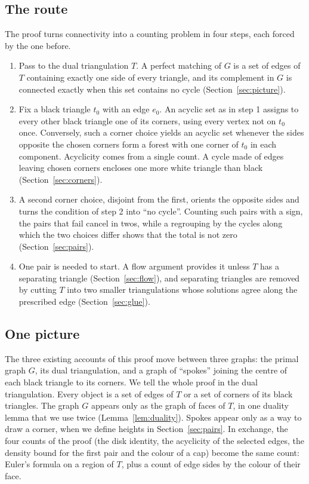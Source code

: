 \documentclass[10pt]{amsart}
\numberwithin{equation}{section}
\theoremstyle{definition}
\theoremstyle{remark}
\newcommand{\T}{T}
\begin{document}
\subsection*{The route}
The proof turns connectivity into a counting problem in four steps, each forced by the one before.
\begin{enumerate}
\item Pass to the dual triangulation $\T$.
A perfect matching of $G$ is a set of edges of $\T$ containing exactly one side of every triangle, and its complement in $G$ is connected exactly when this set contains no cycle (Section~\ref{sec:picture}).
\item Fix a black triangle $t_0$ with an edge $e_0$.
An acyclic set as in step 1 assigns to every other black triangle one of its corners, using every vertex not on $t_0$ once.
Conversely, such a corner choice yields an acyclic set whenever the sides opposite the chosen corners form a forest with one corner of $t_0$ in each component.
Acyclicity comes from a single count. A cycle made of edges leaving chosen corners encloses one more white triangle than black (Section~\ref{sec:corners}).
\item A second corner choice, disjoint from the first, orients the opposite sides and turns the condition of step 2 into ``no cycle''.
Counting such pairs with a sign, the pairs that fail cancel in twos, while a regrouping by the cycles along which the two choices differ shows that the total is not zero (Section~\ref{sec:pairs}).
\item One pair is needed to start. A flow argument provides it unless $\T$ has a separating triangle (Section~\ref{sec:flow}), and separating triangles are removed by cutting $\T$ into two smaller triangulations whose solutions agree along the prescribed edge (Section~\ref{sec:glue}).
\end{enumerate}

\subsection*{One picture}
The three existing accounts of this proof \cite{openai2026,li2026,constructive2026} move between three graphs: the primal graph $G$, its dual triangulation, and a graph of ``spokes'' joining the centre of each black triangle to its corners.
We tell the whole proof in the dual triangulation.
Every object is a set of edges of $\T$ or a set of corners of its black triangles.
The graph $G$ appears only as the graph of faces of $\T$, in one duality lemma that we use twice (Lemma~\ref{lem:duality}).
Spokes appear only as a way to draw a corner, when we define heights in Section~\ref{sec:pairs}.
In exchange, the four counts of the proof (the disk identity, the acyclicity of the selected edges, the density bound for the first pair and the colour of a cap) become the same count: Euler's formula on a region of $\T$, plus a count of edge sides by the colour of their face.
\end{document}
